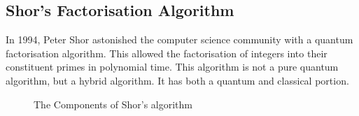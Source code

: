 \subsection{Shor's Factorisation Algorithm}
\label{sec:shorsalg}
In 1994, Peter Shor astonished the computer science community with a quantum factorisation algorithm\cite{Shor:1994jg}.
This allowed the factorisation of integers into their constituent primes in polynomial time.
This algorithm is not a pure quantum algorithm, but a hybrid algorithm.
It has both a quantum and classical portion.

\begin{figure}
\caption{The Components of Shor's algorithm}
\end{figure}

